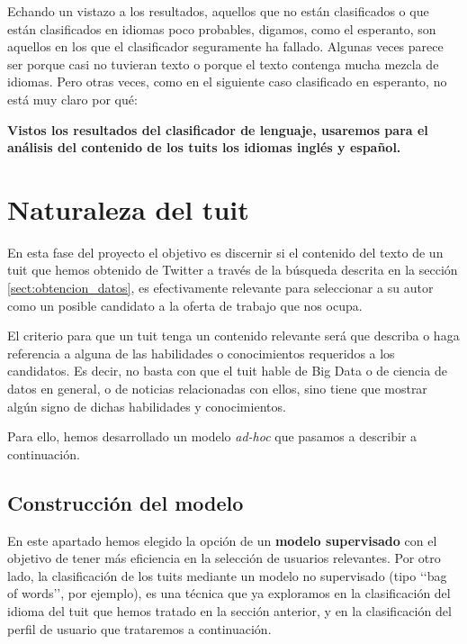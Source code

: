 Echando un vistazo a los resultados, aquellos que no están clasificados o que están
clasificados en idiomas poco probables, digamos, como el esperanto, son aquellos en los
que el clasificador seguramente ha fallado. Algunas veces parece ser porque casi no 
tuvieran texto o porque el texto contenga mucha mezcla de idiomas. Pero otras veces, 
como en el siguiente caso clasificado en esperanto, no está muy claro por qué:



{\bf Vistos los resultados del clasificador de lenguaje, usaremos para el análisis del 
contenido de los tuits los idiomas inglés y español.}

\section{Naturaleza del tuit}
\label{sect:tuits_relevantes}

En esta fase del proyecto el objetivo es discernir si el contenido del texto de un tuit que hemos
obtenido de Twitter a través de la búsqueda descrita en la sección \ref{sect:obtencion_datos},
es efectivamente relevante para seleccionar a su autor como un posible candidato
a la oferta de trabajo que nos ocupa.

El criterio para que un tuit tenga un contenido relevante será que describa o haga referencia
a alguna de las habilidades o conocimientos requeridos a los candidatos. Es decir, no 
basta con que el tuit hable de Big Data o de ciencia de datos en general, o de noticias 
relacionadas con ellos, sino tiene que mostrar algún signo de dichas habilidades y conocimientos.

Para ello, hemos desarrollado un modelo {\em ad-hoc} que pasamos a describir a continuación.

\subsection{Construcción del modelo}
\label{sect:construccion_modelo_tuits_relevantes}
En este apartado hemos elegido la opción de un {\bf modelo supervisado} con el objetivo de tener más eficiencia en la selección de usuarios relevantes.
Por otro lado, la clasificación de los
tuits mediante un modelo no supervisado (tipo \lq\lq bag of words\rq\rq, por ejemplo), 
es una técnica que ya exploramos en la clasificación del idioma del tuit que hemos 
tratado en la sección anterior, y en la clasificación del perfil de usuario que trataremos
a continuación.  

